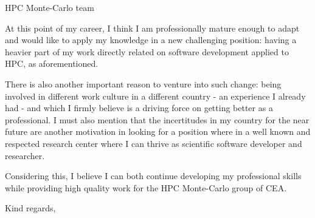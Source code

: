 \documentclass[11pt]{letter}
\begin{document}
\begin{letter}{HPC Monte-Carlo team}

  
  At this point of my career, I think I am professionally mature enough to adapt and would like to apply my knowledge in a new challenging position: having a heavier part of my work directly related on software development applied to HPC, as aforementioned.

  There is also another important reason to venture into such change: being involved in different
  work culture in a different country - an experience I already had - and which I firmly believe is a driving force
  on getting better as a professional. I must also mention that the incertitudes in my country for the near future are another motivation in looking for a position where in a well known and respected research center where I can thrive as scientific software developer and researcher.

  Considering this, I believe I can both continue developing my professional skills while providing high quality work
  for the HPC Monte-Carlo group of CEA.
  
  \closing{Kind regards,}

  
\end{letter}
\end{document}
